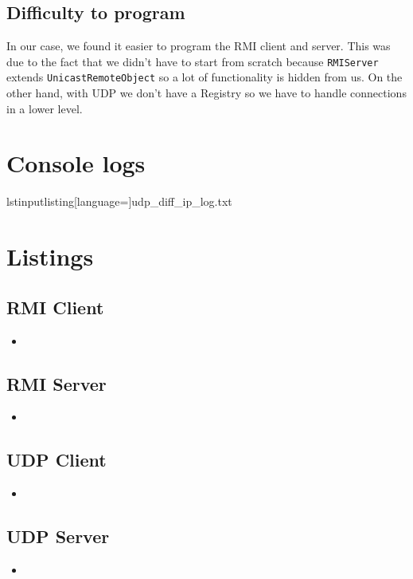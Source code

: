 \documentclass{article}
\newcommand{\insertcode}[2]{\begin{itemize}\item[]\end{itemize}} %
\begin{document}
\subsection{Difficulty to program}
In our case, we found it easier to program the RMI client and server. This was due to the fact
that we didn't have to start from scratch because \texttt{RMIServer} extends \texttt{UnicastRemoteObject} so 
a lot of functionality is hidden from us. On the other hand, with UDP we don't have a Registry
so we have to handle connections in a lower level.
\section{Console logs}
lstinputlisting[language={}]{udp\_diff\_ip\_log.txt}

\section{Listings}
\subsection{RMI Client}
\insertcode{"rmi/RMIClient.java"}{RMI Client}

\subsection{RMI Server}
\insertcode{"rmi/RMIServer.java"}{RMI Server}

\subsection{UDP Client}
\insertcode{"udp/UDPClient.java"}{UDP Client}

\subsection{UDP Server}
\insertcode{"udp/UDPServer.java"}{UDP Server}
\end{document}
